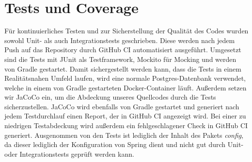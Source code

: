 
\chapter{Tests und Coverage}
\label{ch:tests}

Für kontinuierliches Testen und zur Sicherstellung der Qualität des Codes wurden sowohl Unit- als auch Integrationstests geschrieben.
Diese werden nach jedem Push auf das Repository durch GitHub CI automatisiert ausgeführt.
Umgesetzt sind die Tests mit JUnit als Testframework, Mockito für Mocking und werden von Gradle gestartet.
Damit sichergestellt werden kann, dass die Tests in einem Realitätsnahen Umfeld laufen, wird eine normale Postgres-Datenbank verwendet,
welche in einem von Gradle gestarteten Docker-Container läuft.
Außerdem setzen wir JaCoCo ein, um die Abdeckung unseres Quellcodes durch die Tests sicherzustellen.
JaCoCo wird ebenfalls von Gradle gestartet und generiert nach jedem Testdurchlauf einen Report, der in GitHub CI angezeigt wird.
Bei einer zu niedrigen Testabdeckung wird außerdem ein fehlgeschlagener Check in GitHub CI generiert.
Ausgenommen von den Tests ist lediglich der Inhalt des Pakets \textit{config}, da dieser lediglich der Konfiguration von Spring dient
und nicht gut durch Unit- oder Integrationstests geprüft werden kann.